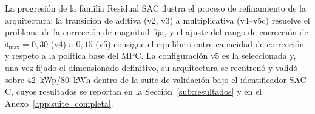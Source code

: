 \documentclass[12pt, a4paper, twoside]{report}
\begin{document}
La progresión de la familia Residual SAC ilustra el proceso de refinamiento de
la arquitectura: la transición de aditiva (v2, v3) a multiplicativa (v4--v5c)
resuelve el problema de la corrección de magnitud fija, y el ajuste del rango
de corrección de $\delta_{\max} = 0{,}30$ (v4) a $0{,}15$ (v5) consigue el
equilibrio entre capacidad de corrección y respeto a la política base del MPC.
La configuración v5 es la seleccionada y, una vez fijado el dimensionado
definitivo, su arquitectura se reentrenó y validó sobre
\SI{42}{kWp}/\SI{80}{kWh} dentro de la suite de validación bajo el
identificador SAC-C, cuyos resultados se reportan en la
Sección~\ref{sub:resultados} y en el Anexo~\ref{app:suite_completa}.
\end{document}
